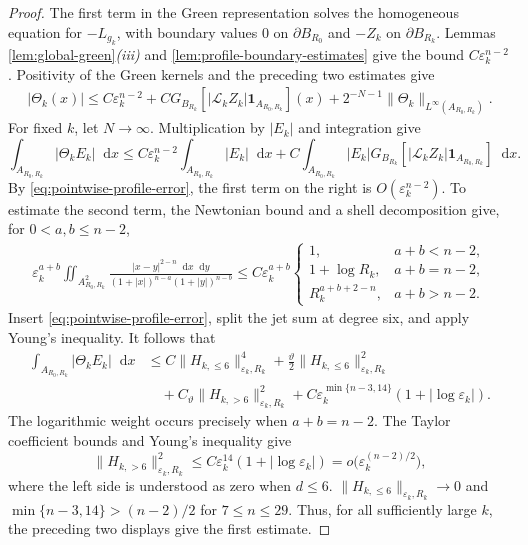 \documentclass[11pt]{article}
\numberwithin{equation}{section}
\theoremstyle{remark}
\newcommand{\dd}{\mathop{}\!\mathrm{d}}
\begin{document}
\begin{proof}
The first term in the Green representation solves the homogeneous
equation for \(-L_{g_k}\), with boundary values \(0\) on
$\partial B_{R_0}$ and  $-Z_k$ on $\partial B_{R_k}$.  Lemmas
\ref{lem:global-green}\emph{(iii)} and
\ref{lem:profile-boundary-estimates} give the bound
$C\varepsilon_k^{n-2}$. Positivity of the Green kernels and the preceding
two estimates give
{
\[
 \begin{aligned}
 |\Theta_k(x)|
 \le C\varepsilon_k^{n-2}
 +C G_{B_{R_k}}
 [|\mathcal L_kZ_k|\mathbf 1_{A_{R_0,R_k}}](x)+2^{-N-1}
 \|\Theta_k\|_{L^\infty(A_{R_0,R_k})}.
 \end{aligned}
\]
}
For fixed \(k\), let \(N\to\infty\). Multiplication by \(|E_k|\) and
integration give
{
\[
 \int_{A_{R_0,R_k}}|\Theta_kE_k|\dd x
 \le C\varepsilon_k^{n-2}\int_{A_{R_0,R_k}}|E_k|\dd x
 +C\int_{A_{R_0,R_k}}|E_k|
 G_{B_{R_k}}
 [|\mathcal L_kZ_k|\mathbf 1_{A_{R_0,R_k}}]\dd x.
\]
}
 By \eqref{eq:pointwise-profile-error}, the first term on the right is
$O(\varepsilon_k^{n-2})$.  To estimate the second term, the Newtonian
bound and a shell decomposition give, for  $0<a,b\le n-2$,
{
\[
\begin{aligned}
 \varepsilon_k^{a+b}\iint_{A_{R_0,R_k}^2}
 \frac{|x-y|^{2-n}\dd x\dd y}
 {(1+|x|)^{n-a}(1+|y|)^{n-b}}
 \le C\varepsilon_k^{a+b}
 \begin{cases}
  1,&a+b<n-2,\\
  1+\log R_k,&a+b=n-2,\\
  R_k^{a+b+2-n},&a+b>n-2.
 \end{cases}
\end{aligned}
\]
}
 Insert \eqref{eq:pointwise-profile-error}, split the  jet sum at degree
six, and apply Young's inequality.  It follows that
{
\[
\begin{aligned}
 \int_{A_{R_0,R_k}}|\Theta_kE_k|\dd x
 &\le C\|H_{k,\le6}\|_{\varepsilon_k,R_k}^4
 +\frac{\vartheta}{2}\|H_{k,\le6}\|_{\varepsilon_k,R_k}^2\\
 &\quad+C_\vartheta\|H_{k,>6}\|_{\varepsilon_k,R_k}^2
 +C\varepsilon_k^{\min\{n-3,14\}}
 (1+|\log\varepsilon_k|).
\end{aligned}
\]
}
The logarithmic weight occurs precisely when $a+b=n-2$.  The Taylor
coefficient bounds and Young's inequality give
{
\[
 \|H_{k,>6}\|_{\varepsilon_k,R_k}^2
 \le C\varepsilon_k^{14}(1+|\log\varepsilon_k|)
 =o\bigl(\varepsilon_k^{(n-2)/2}\bigr),
\]
}
where the left side is understood as zero when $d\le6$.
$\|H_{k,\le6}\|_{\varepsilon_k,R_k}\to0$ and
$\min\{n-3,14\}>(n-2)/2$ for  $7\le n\le29$.  Thus, for all sufficiently
large $k$, the preceding two displays give the first estimate.


\end{proof}
\end{document}
